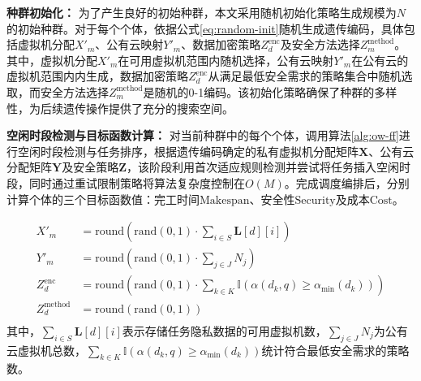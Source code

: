 \textbf{种群初始化：}
为了产生良好的初始种群，本文采用随机初始化策略生成规模为$N$的初始种群。对于每个个体，依据公式\eqref{eq:random-init}随机生成遗传编码，具体包括虚拟机分配$X'_m$、公有云映射$Y'_m$、数据加密策略$Z^\text{enc}_d$及安全方法选择$Z^\text{method}_m$。其中，虚拟机分配$X'_m$在可用虚拟机范围内随机选择，公有云映射$Y'_m$在公有云的虚拟机范围内内生成，数据加密策略$Z^\text{enc}_d$从满足最低安全需求的策略集合中随机选取，而安全方法选择$Z^\text{method}_m$是随机的0-1编码。该初始化策略确保了种群的多样性，为后续遗传操作提供了充分的搜索空间。

\textbf{空闲时段检测与目标函数计算：}
对当前种群中的每个个体，调用算法\ref{alg:ow-ff}进行空闲时段检测与任务排序，根据遗传编码确定的私有虚拟机分配矩阵$\mathbf{X}$、公有云分配矩阵$\mathbf{Y}$及安全策略$\mathbf{Z}$，该阶段利用首次适应规则检测并尝试将任务插入空闲时段，同时通过重试限制策略将算法复杂度控制在\(O(M)\)。完成调度编排后，分别计算个体的三个目标函数值：完工时间\(\text{Makespan}\)、安全性\(\text{Security}\)及成本\(\text{Cost}\)。

\begin{equation}
    \begin{aligned}
        X'_m &= \text{round}\left(\text{rand}(0,1) \cdot \sum_{i \in S}\mathbf{L}[d][i]\right)  \\
        Y'_m &= \text{round}\left(\text{rand}(0,1) \cdot \sum_{j \in J}N_j\right)  \\
        Z^\text{enc}_d &= \text{round}\left(\text{rand}(0,1) \cdot \sum_{k \in K}\mathbb{I}(\alpha(d_k,q) \geq \alpha_{\min}(d_k))\right)  \\
        Z^\text{method}_d &= \text{round}\left(\text{rand}(0,1)\right) \\
        \label{eq:random-init}
    \end{aligned}
\end{equation}
其中，\(\sum_{i \in S}\mathbf{L}[d][i]\)表示存储任务隐私数据的可用虚拟机数，\(\sum_{j \in J}N_j\)为公有云虚拟机总数，\(\sum_{k \in K}\mathbb{I}(\alpha(d_k,q) \geq \alpha_{\min}(d_k))\)统计符合最低安全需求的策略数。


